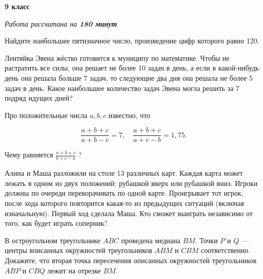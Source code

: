 \centerline{\bf \huge 9 класс}
\centerline{\normalsize{\it Работа рассчитана на \bf{180} минут}}

Найдите наибольшее пятизначное число, произведение цифр которого равно 120.

Лентяйка Эвена жёстко готовится к муниципу по математике. Чтобы не растратить все силы, она решает не более 10 задач в день, а если в какой-нибудь день она решала больше 7 задач, то следующие два дня она решала не более 5 задач в день. Какое наибольшее количество задач Эвена могла решить за 7 подряд идущих дней?

Про положительные числа $a, b, c$ известно, что

$$
\frac{a+b+c}{a+b-c}=7, \quad \frac{a+b+c}{a+c-b}=1,75 .
$$


Чему равняется $\frac{a+b+c}{b+c-a}$ ?


Алина и Маша разложили на столе 13 различных карт. Каждая карта может лежать в одном из двух положений: рубашкой вверх или рубашкой вниз. Игроки должны по очереди переворачивать по одной карте. Проигрывает тот игрок, после хода которого повторится какая-то из предыдущих ситуаций (включая изначальную). Первый ход сделала Маша. Кто сможет выиграть независимо от того, как будет играть соперник?


В остроугольном треугольнике $A B C$ проведена медиана $B M$. Точки $P$ и $Q$ --- центры вписанных окружностей треугольников $A B M$ и $C B M$ соответственно. Докажите, что вторая точка пересечения описанных окружностей треугольников $A B P$ и $C B Q$ лежит на отрезке $B M$.

